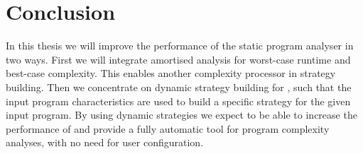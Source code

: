 \documentclass[envcountsame]{llncs}
\begin{document}
\section{Conclusion}

In this thesis we will improve the performance of the static program analyser \tct{} in two ways.
First we will integrate amortised analysis for worst-case runtime and best-case complexity. This
enables another complexity processor in \tct{} strategy building. Then we concentrate on dynamic
strategy building for \tct{}, such that the input program characteristics are used to build a
specific strategy for the given input program. By using dynamic strategies we expect to be able to
increase the performance of \tct{} and provide a fully automatic tool for program complexity
analyses, with no need for user configuration.






\appendix
\end{document}
